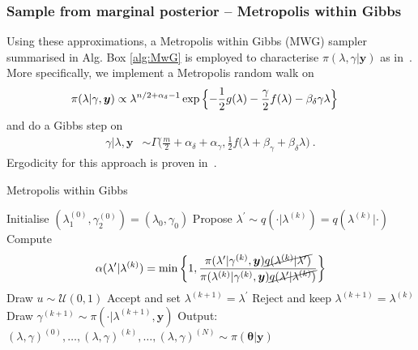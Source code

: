 \subsubsection{Sample from marginal posterior -- Metropolis within Gibbs}
\label{subsec:MWG}
Using these approximations, a Metropolis within Gibbs (MWG) sampler summarised in Alg. Box \ref{alg:MwG} is employed to characterise $\pi(\lambda,\gamma|\bm{y})$ as in~\cite{fox2016fast}.
More specifically, we implement a Metropolis random walk on
\begin{align}
	\label{eq:margApplCondGam}
	\pi(\lambda | \gamma, \bm{y}) &\propto \lambda^{n/2 +\alpha_{\delta}-1} \exp{\Bigl\{ - \frac{1}{2} g ( \lambda) - \frac{\gamma}{2} f ( \lambda) - \beta_\delta \gamma \lambda \Bigr\}}
\end{align} 
and do a Gibbs step on
\begin{align}
	\gamma |  \lambda, \bm{y} &\sim \Gamma \bigg( \frac{m}{2} + \alpha_\delta + \alpha_\gamma, \frac{1}{2} f (\lambda + \beta_\gamma + \beta_\delta \lambda \bigg)\label{eq:GibbsStep} \ .
\end{align} 
Ergodicity for this approach is proven in~\cite{roberts2006harris}.

\begin{algorithm}[!ht]
	\caption{Metropolis within Gibbs}
	\begin{algorithmic}[1]
		\STATE Initialise \( ( \lambda_1^{(0)} , \gamma_2^{(0)}  )= ( \lambda_{0} , \gamma_{0}  )  \)
		\STATE Propose \( \lambda^{\prime} \sim q(\cdot   | \lambda^{(k)}) = q(\lambda^{(k)} |\cdot  ) \)
		\STATE Compute
		\[ \alpha( \lambda^{\prime} | \lambda^{(k)}) = \min \left\{ 1, \frac{\pi(\lambda^{\prime}  | \gamma^{(k)}, \bm{y}) \cancel{q(\lambda^{(k)} | \lambda^{\prime} ) } }{\pi(\lambda^{(k)} | \gamma^{(k)}, \bm{y}) \cancel{q(\lambda^{\prime} | \lambda^{(k)})} } \right\} \]
		\STATE Draw $u \sim \mathcal{U}(0,1)$
		\STATE Accept and set \( \lambda^{(k+1)} = \lambda^{\prime} \)
		\ELSE  
		\STATE Reject and keep \(\lambda^{(k+1)} = \lambda^{(k)} \)
		\ENDIF
		\STATE Draw \(\gamma^{(k+1)} \sim  \pi( \cdot | \lambda^{(k+1)} , \bm{y} )\) 
		\ENDFOR
		\STATE Output: $ (\lambda,\gamma)^{(0)}, \dots,  (\lambda,\gamma)^{(k)} , \dots,   (\lambda,\gamma)^{(N)} \sim \pi(\bm{\theta}| \bm{y}) $
	\end{algorithmic}
	\label{alg:MwG}
\end{algorithm}

